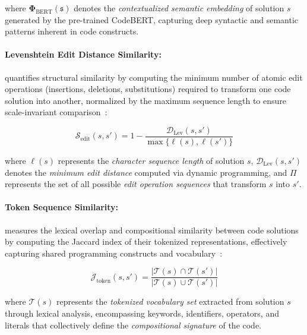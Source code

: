 \documentclass[11pt]{article}
\theoremstyle{definition}
\theoremstyle{remark}
\begin{document}
where $\boldsymbol{\Phi}_{\text{BERT}}(\mathfrak{s})$ denotes the \textit{contextualized semantic embedding} of solution $s$ generated by the pre-trained CodeBERT, capturing deep syntactic and semantic patterns inherent in code constructs.



\paragraph{Levenshtein Edit Distance Similarity:} quantifies structural similarity by computing the minimum number of atomic edit operations (insertions, deletions, substitutions) required to transform one code solution into another, normalized by the maximum sequence length to ensure scale-invariant comparison~\citep{yujian2007normalized}:

\begin{equation}
\mathcal{S}_{\text{edit}}(s, s') = 1 - \frac{\mathcal{D}_{\text{Lev}}(s, s')}{\max\{\ell(s), \ell(s')\}}
\end{equation}

where $\ell(s)$ represents the \textit{character sequence length} of solution $s$, $\mathcal{D}_{\text{Lev}}(s, s')$ denotes the \textit{minimum edit distance} computed via dynamic programming, and $\Pi$ represents the set of all possible \textit{edit operation sequences} that transform $s$ into $s'$.


\paragraph{Token Sequence Similarity:} measures the lexical overlap and compositional similarity between code solutions by computing the Jaccard index of their tokenized representations, effectively capturing shared programming constructs and vocabulary~\citep{islam2008semantic}:

\begin{equation}
\mathcal{J}_{\text{token}}(s, s') = \frac{|\mathcal{T}(s) \cap \mathcal{T}(s')|}{|\mathcal{T}(s) \cup \mathcal{T}(s')|}
\end{equation}

where $\mathcal{T}(s)$ represents the \textit{tokenized vocabulary set} extracted from solution $s$ through lexical analysis, encompassing keywords, identifiers, operators, and literals that collectively define the \textit{compositional signature} of the code.
\end{document}
